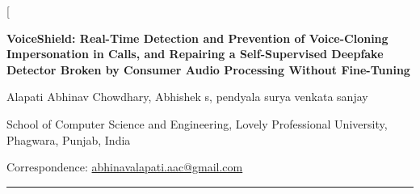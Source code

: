\documentclass[10pt,a4paper,twocolumn]{article}
\begin{document}
\twocolumn[
\begin{center}
{\sffamily\bfseries\Large VoiceShield: Real-Time Detection and Prevention of Voice-Cloning Impersonation in Calls, and Repairing a Self-Supervised Deepfake Detector Broken by Consumer Audio Processing Without Fine-Tuning\par}
\vspace{6pt}
{\normalsize Alapati Abhinav Chowdhary, Abhishek s, pendyala surya venkata sanjay\par}
\vspace{3pt}
{\small School of Computer Science and Engineering, Lovely Professional University, Phagwara, Punjab, India\par}
{\small Correspondence: \href{mailto:abhinavalapati.aac@gmail.com}{abhinavalapati.aac@gmail.com}\par}
\end{center}
\vspace{2pt}
\noindent\rule{\textwidth}{0.4pt}
\vspace{2pt}
\end{document}

